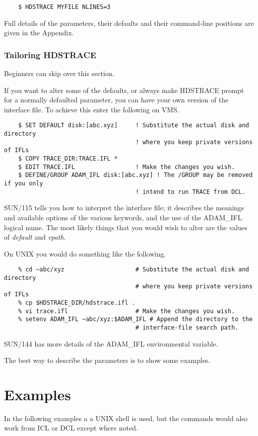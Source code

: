 \small
\begin{verbatim}
    $ HDSTRACE MYFILE NLINES=3
\end{verbatim}
\normalsize
Full details of the parameters, their defaults and their command-line
positions are given in the Appendix.

\subsubsection{Tailoring HDSTRACE}

Beginners can skip over this section.

If you want to alter some of the defaults, or always make
{\footnotesize HDSTRACE} prompt for a normally defaulted parameter,
you can have your own version of the interface file.
To achieve this enter the following on VMS.

\small
\begin{verbatim}
    $ SET DEFAULT disk:[abc.xyz]     ! Substitute the actual disk and directory
                                     ! where you keep private versions of IFLs
    $ COPY TRACE_DIR:TRACE.IFL *
    $ EDIT TRACE.IFL                 ! Make the changes you wish.
    $ DEFINE/GROUP ADAM_IFL disk:[abc.xyz] ! The /GROUP may be removed if you only
                                     ! intend to run TRACE from DCL.
\end{verbatim}
\normalsize
SUN/115 tells you how to interpret the interface file; it describes
the meanings and available options of the various keywords, and the use
of the ADAM\_IFL logical name.  The most likely things that you would
wish to alter are the values of {\em default\/} and {\em vpath}.

On UNIX you would do something like the following.
\small
\begin{verbatim}
    % cd ~abc/xyz                    # Substitute the actual disk and directory
                                     # where you keep private versions of IFLs
    % cp $HDSTRACE_DIR/hdstrace.ifl .
    % vi trace.ifl                   # Make the changes you wish.
    % setenv ADAM_IFL ~abc/xyz:$ADAM_IFL # Append the directory to the
                                     # interface-file search path.
\end{verbatim}
\normalsize
SUN/144 has more details of the ADAM\_IFL environmental variable.
\bigskip

The best way to describe the parameters is to show some examples.

\section{Examples}
\label{se:example}
In the following examples a a UNIX shell is used, but the commands would
also work from ICL or DCL except where noted.


